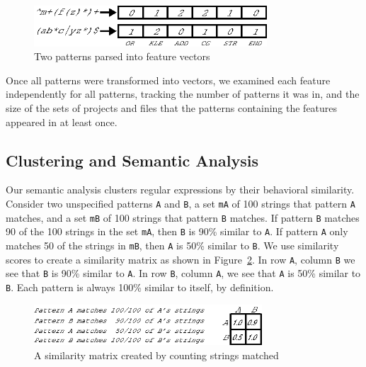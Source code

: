 \begin{figure}[tb]
\centering
\includegraphics[height=0.6in]{../illustrations/featureParsing.eps}
\caption{Two patterns parsed into feature vectors}
\label{fig:featureParsing}
\end{figure}

Once all patterns were transformed into vectors, we examined each feature independently for all patterns, tracking the number of patterns it was in, and the size of the sets of projects and files that the patterns containing the features appeared in at least once.

\subsection{Clustering and Semantic Analysis}
Our semantic analysis clusters regular expressions by their behavioral similarity.
Consider two unspecified patterns {\tt A} and {\tt B}, a set {\tt mA} of 100 strings that pattern {\tt A} matches, and a set {\tt mB} of 100 strings that pattern {\tt B} matches.
If pattern {\tt B} matches 90 of the 100 strings in the set {\tt mA}, then {\tt B} is 90\% similar to {\tt A}.
If pattern {\tt A} only matches 50 of the strings in {\tt mB}, then {\tt A} is 50\% similar to {\tt B}.
We use similarity scores to create a similarity matrix as shown in Figure~\ref{fig:minimalMatrix}.
In row {\tt A}, column {\tt B} we see that {\tt B} is 90\% similar to {\tt A}.
In row {\tt B}, column {\tt A}, we see that {\tt A} is 50\% similar to {\tt B}.  Each pattern is always 100\% similar to itself, by definition.


\begin{figure}[tb]
\centering
\includegraphics[height=0.6in]{../illustrations/minimalMatrix.eps}
\caption{A similarity matrix created by counting strings matched}
\label{fig:minimalMatrix}
\end{figure}


